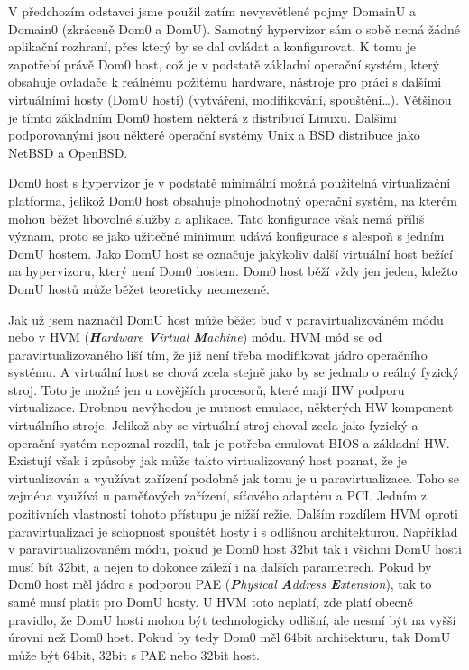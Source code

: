 V předchozím odstavci jsme použil zatím nevysvětlené pojmy DomainU a Domain0 (zkráceně Dom0 a DomU). Samotný \xen hypervizor sám o sobě nemá žádné aplikační rozhraní, přes který by se dal ovládat a konfigurovat. K tomu je zapotřebí právě Dom0 host, což je v podstatě základní operační systém, který obsahuje ovladače k reálnému požitému hardware, nástroje pro práci s dalšími virtuálními hosty (DomU hosti) (vytváření, modifikování, spouštění\dots). Většinou je tímto základním Dom0 hostem některá z distribucí Linuxu. Dalšími podporovanými jsou některé operační systémy Unix a BSD distribuce jako NetBSD a OpenBSD.

Dom0 host s \xen hypervizor je v podstatě minimální možná použitelná virtualizační platforma, jelikož Dom0 host obsahuje plnohodnotný operační systém, na kterém mohou běžet libovolné služby a aplikace. Tato konfigurace však nemá příliš význam, proto se jako užitečné minimum udává konfigurace s alespoň s jedním DomU hostem. Jako DomU host se označuje jakýkoliv další virtuální host bežící na \xen hypervizoru, který není Dom0 hostem. Dom0 host běží vždy jen jeden, kdežto DomU hostů může běžet teoreticky neomezeně.

Jak už jsem naznačil DomU host může běžet buď v paravirtualizováném módu nebo v HVM (\emph{\textbf{H}ardware \textbf{V}irtual \textbf{M}achine}) módu. HVM mód se od paravirtualizovaného liší tím, že již není třeba modifikovat jádro operačního systému. A virtuální host se chová zcela stejně jako by se jednalo o reálný fyzický stroj. Toto je možné jen u novějších procesorů, které mají HW podporu virtualizace. Drobnou nevýhodou je nutnost emulace, některých HW komponent virtuálního stroje. Jelikož aby se virtuální stroj choval zcela jako fyzický a operační systém nepoznal rozdíl, tak je potřeba emulovat BIOS a základní HW. Existují však i způsoby jak může takto virtualizovaný host poznat, že je virtualizován a využívat zařízení podobně jak tomu je u paravirtualizace. Toho se zejména využívá u paměťových zařízení, síťového adaptéru a PCI. Jedním z pozitivních vlastností tohoto přístupu je nižší režie. Dalším rozdílem HVM oproti paravirtualizaci je schopnost spouštět hosty i s odlišnou architekturou. Například v paravirtualizovaném módu, pokud je Dom0 host 32bit tak i všichni DomU hosti musí bít 32bit, a nejen to dokonce záleží i na dalších parametrech. Pokud by Dom0 host měl jádro s podporou PAE (\emph{\textbf{P}hysical \textbf{A}ddress \textbf{E}xtension}), tak to samé musí platit pro DomU hosty. U HVM toto neplatí, zde platí obecně pravidlo, že DomU hosti mohou být technologicky odlišní, ale nesmí být na vyšší úrovni než Dom0 host. Pokud by tedy Dom0 měl 64bit architekturu, tak DomU může být 64bit, 32bit s PAE nebo 32bit host.

